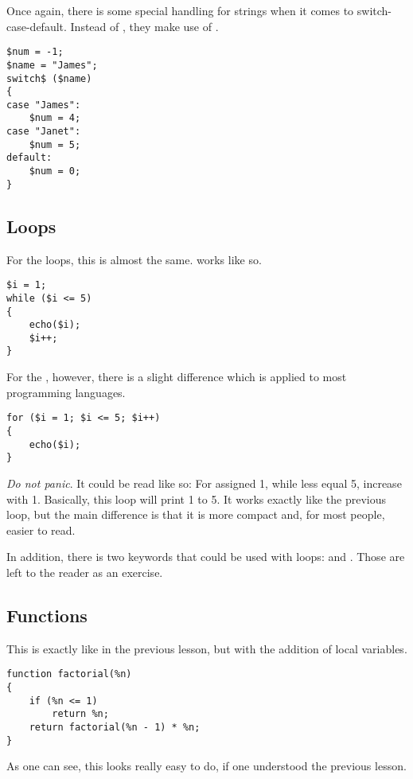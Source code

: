 Once again, there is some special handling for strings when it comes to switch-case-default. Instead of , they make use of .

\begin{lstlisting}[style=ts]
$num = -1;
$name = "James";
switch$ ($name)
{
case "James":
	$num = 4;
case "Janet":
	$num = 5;
default:
	$num = 0;
}
\end{lstlisting}

\subsection{Loops}

For the loops, this is almost the same.  works like so.

\begin{lstlisting}[style=ts]
$i = 1;
while ($i <= 5)
{
	echo($i);
	$i++;
}
\end{lstlisting}

For the , however, there is a slight difference which is applied to most programming languages.

\begin{lstlisting}[style=ts]
for ($i = 1; $i <= 5; $i++)
{
	echo($i);
}
\end{lstlisting}

\textit{Do not panic}. It could be read like so: For  assigned 1, while  less equal 5, increase  with 1. Basically, this loop will print 1 to 5. It works exactly like the previous loop, but the main difference is that it is more compact and, for most people, easier to read.

In addition, there is two keywords that could be used with loops:  and . Those are left to the reader as an exercise.

\subsection{Functions}

This is exactly like in the previous lesson, but with the addition of local variables.

\begin{lstlisting}[style=ts]
function factorial(%n)
{
	if (%n <= 1)
		return %n;
	return factorial(%n - 1) * %n;
}
\end{lstlisting}

As one can see, this looks really easy to do, if one understood the previous lesson.


